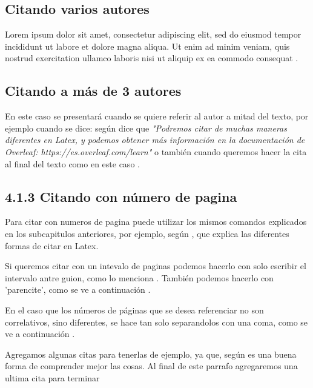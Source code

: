 \subsection*{Citando varios autores}

Lorem ipsum dolor sit amet, consectetur adipiscing elit, sed do eiusmod tempor incididunt ut labore et dolore magna aliqua. Ut enim ad minim veniam, quis nostrud exercitation ullamco laboris nisi ut aliquip ex ea commodo consequat \parencite{libro:ejemplo_varios_autores}.


\subsection*{Citando a más de 3 autores}
En este caso se presentará cuando se quiere referir al autor a mitad del texto, por ejemplo cuando se dice: según \textcite{articulo:ejemplo_1} dice que \textit{"Podremos citar de muchas maneras diferentes en Latex, y podemos obtener más información en la documentación de Overleaf: https://es.overleaf.com/learn"} o también cuando queremos hacer la cita al final del texto como en este caso \parencite{articulo:ejemplo_1}.


\subsection{4.1.3 Citando con número de pagina}

Para citar con numeros de pagina puede utilizar los mismos comandos explicados en los subcapitulos anteriores, por ejemplo, según \textcite[p. 7]{libro:ejemplo_2}, que explica las diferentes formas de citar en Latex.

Si queremos citar con un intevalo de paginas podemos hacerlo con solo escribir el intervalo antre guion, como lo menciona \textcite[p. 32-39]{articulo:ejemplo_1}. También podemos hacerlo con 'parencite', como se ve a continuación \parencite[p. 32-39]{articulo:ejemplo_1}.

En el caso que los números de páginas que se desea referenciar no son correlativos, sino diferentes, se hace tan solo separandolos con una coma, como se ve a continuación \parencite[p. 23, 37, 39]{articulo:ejemplo_1}.

Agregamos algunas citas para tenerlas de ejemplo, ya que, según \textcite{Gorman2020} es una buena forma de comprender mejor las cosas. Al final de este parrafo agregaremos una ultima cita para terminar \parencite{Garcia2019}
